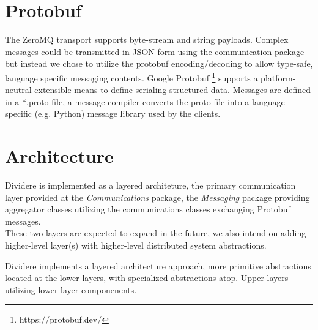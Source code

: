 \documentclass[fontsize=12pt]{book}
\begin{document}
\chapter{Protobuf}
The ZeroMQ transport supports byte-stream and string payloads.  Complex messages \underline{could} be transmitted in JSON form using the communication package but instead we chose to utilize the protobuf encoding/decoding to allow type-safe, language specific messaging contents.  Google Protobuf \footnote{https://protobuf.dev/} supports a platform-neutral extensible means to define serialing structured data.  Messages are defined in a *.proto file, a message compiler converts the proto file into a language-specific (e.g. Python) message library used by the clients.
\\
\chapter{Architecture}

Dividere is implemented as a layered architeture, the primary communication layer provided at the \emph{Communications} package, the \emph{Messaging} package providing aggregator classes utilizing the communications classes exchanging Protobuf messages.  
\\
These two layers are expected to expand in the future, we also intend on adding higher-level layer(s) with higher-level distributed system abstractions.
\\

  {
     \vbox {
      }
     \vbox {
      }
      \vbox {
      }
 } 

Dividere implements a layered architecture approach, more primitive abstractions located at the lower layers, with specialized abstractions atop.  Upper layers utilizing lower layer componenents.
\end{document}
